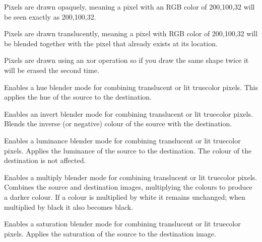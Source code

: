 
Pixels are drawn opaquely, meaning a pixel with an RGB color of 200,100,32 will be seen exactly as 200,100,32.


Pixels are drawn translucently, meaning a pixel with RGB color of 200,100,32 will be blended together with the pixel that already exists at its location.


Pixels are drawn using an xor operation so if you draw the same shape twice it will be erased the second time.


Enables a hue blender mode for combining translucent or lit truecolor pixels. This applies the hue of the source to the destination.


Enables an invert blender mode for combining translucent or lit truecolor pixels. Blends the inverse (or negative) colour of the source with the destination.


Enables a luminance blender mode for combining translucent or lit truecolor pixels. Applies the luminance of the source to the destination.  The colour of the destination is not affected.


Enables a multiply blender mode for combining translucent or lit truecolor pixels. Combines the source and destination images, multiplying the colours to produce a darker colour. If a colour is multiplied by white it remains unchanged; when multiplied by black it also becomes black.


Enables a saturation blender mode for combining translucent or lit truecolor pixels. Applies the saturation of the source to the destination image.

